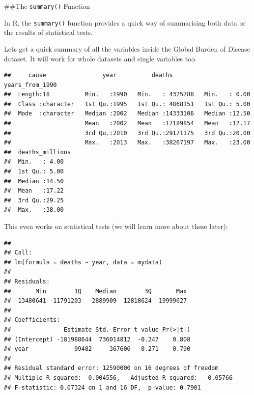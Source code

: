 \documentclass[]{book}
\makeatletter
\newenvironment{Shaded}{\begin{snugshade}}{\end{snugshade}}
\newcommand{\CommentTok}[1]{\textcolor[rgb]{0.56,0.35,0.01}{\textit{#1}}}
\newcommand{\DataTypeTok}[1]{\textcolor[rgb]{0.13,0.29,0.53}{#1}}
\newcommand{\KeywordTok}[1]{\textcolor[rgb]{0.13,0.29,0.53}{\textbf{#1}}}
\newcommand{\NormalTok}[1]{#1}
\newcommand{\OperatorTok}[1]{\textcolor[rgb]{0.81,0.36,0.00}{\textbf{#1}}}
\newcommand{\StringTok}[1]{\textcolor[rgb]{0.31,0.60,0.02}{#1}}
\newenvironment{kframe}{%
\medskip{}
\setlength{\fboxsep}{.8em}
 \def\at@end@of@kframe{}%
 \ifinner\ifhmode%
  \def\at@end@of@kframe{\end{minipage}}%
  \begin{minipage}{\columnwidth}%
 \fi\fi%
 \def\FrameCommand##1{\hskip\@totalleftmargin \hskip-\fboxsep
 \colorbox{shadecolor}{##1}\hskip-\fboxsep
     \hskip-\linewidth \hskip-\@totalleftmargin \hskip\columnwidth}%
 \MakeFramed {\advance\hsize-\width
   \@totalleftmargin\z@ \linewidth\hsize
   \@setminipage}}%
 {\par\unskip\endMakeFramed%
 \at@end@of@kframe}
\renewenvironment{Shaded}{\begin{kframe}}{\end{kframe}}
\theoremstyle{definition}
\theoremstyle{definition}
\theoremstyle{definition}
\theoremstyle{remark}
\makeatother
\begin{document}
\#\#The \texttt{summary()} Function

In R, the \texttt{summary()} function provides a quick way of
summarising both data or the results of statistical tests.

Lets get a quick summary of all the variables inside the Global Burden
of Disease dataset. It will work for whole datasets and single variables
too.

\begin{Shaded}
\end{Shaded}

\begin{verbatim}
##     cause                year          deaths         years_from_1990
##  Length:18          Min.   :1990   Min.   : 4325788   Min.   : 0.00  
##  Class :character   1st Qu.:1995   1st Qu.: 4868151   1st Qu.: 5.00  
##  Mode  :character   Median :2002   Median :14333106   Median :12.50  
##                     Mean   :2002   Mean   :17189854   Mean   :12.17  
##                     3rd Qu.:2010   3rd Qu.:29171175   3rd Qu.:20.00  
##                     Max.   :2013   Max.   :38267197   Max.   :23.00  
##  deaths_millions
##  Min.   : 4.00  
##  1st Qu.: 5.00  
##  Median :14.50  
##  Mean   :17.22  
##  3rd Qu.:29.25  
##  Max.   :38.00
\end{verbatim}

This even works on statistical tests (we will learn more about these
later):

\begin{Shaded}
\end{Shaded}

\begin{verbatim}
## 
## Call:
## lm(formula = deaths ~ year, data = mydata)
## 
## Residuals:
##       Min        1Q    Median        3Q       Max 
## -13480641 -11791203  -2889909  12818624  19999627 
## 
## Coefficients:
##               Estimate Std. Error t value Pr(>|t|)
## (Intercept) -181988644  736014812  -0.247    0.808
## year             99482     367606   0.271    0.790
## 
## Residual standard error: 12590000 on 16 degrees of freedom
## Multiple R-squared:  0.004556,   Adjusted R-squared:  -0.05766 
## F-statistic: 0.07324 on 1 and 16 DF,  p-value: 0.7901
\end{verbatim}
\end{document}
